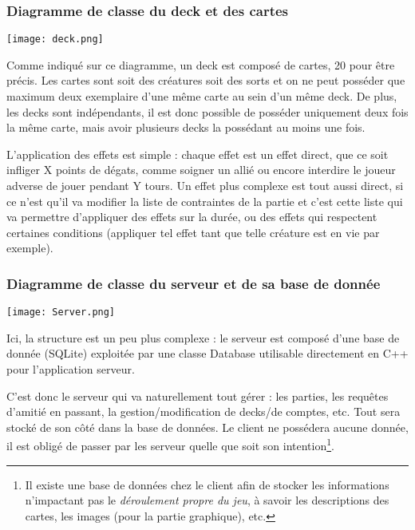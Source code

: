 \documentclass[12pt]{article}
\begin{document}
		\newpage
		\subsubsection{Diagramme de classe du \gls{deck} et des cartes}
		\begin{center}\texttt{[image: deck.png]}\end{center}
			Comme indiqué sur ce diagramme, un \gls{deck} est composé de cartes, 20 pour être précis. Les cartes sont soit des créatures
			soit des \glspl{sort} et on ne peut posséder que maximum deux exemplaire d'une même carte au sein d'un même \gls{deck}.
			De plus, les \glspl{deck} sont indépendants, il est donc possible de posséder uniquement deux fois la même carte, mais avoir plusieurs \glspl{deck} la possédant au moins une fois.

			L'application des effets est simple : chaque effet est un effet direct, que ce soit infliger X points de dégats, comme soigner un allié ou encore interdire le joueur adverse de jouer pendant Y tours.
			Un effet plus complexe est tout aussi direct, si ce n'est qu'il va modifier la liste de contraintes de la partie et c'est cette liste qui va permettre d'appliquer des effets sur la durée, ou des effets qui respectent certaines conditions (appliquer tel effet tant que telle créature est en vie par exemple).
	
		\newpage
		\subsubsection{Diagramme de classe du serveur et de sa base de donnée}
		\begin{center}\texttt{[image: Server.png]}\end{center}
			Ici, la structure est un peu plus complexe : le serveur est composé d'une base de donnée (SQLite) exploitée par une classe Database utilisable directement en C++ pour l'application serveur.

			C'est donc le serveur qui va naturellement tout gérer : les parties, les requêtes d'amitié en passant,
			la gestion/modification de \glspl{deck}/de comptes, etc. Tout sera stocké de son côté dans la base de données.
			Le client ne possédera aucune donnée, il est obligé de passer par les serveur quelle que soit son intention\footnote{Il existe une base de
			données chez le client afin de stocker les informations n'impactant pas le \textit{déroulement propre du jeu}, à savoir les descriptions des cartes,
			les images (pour la partie graphique), etc.}.
\end{document}
